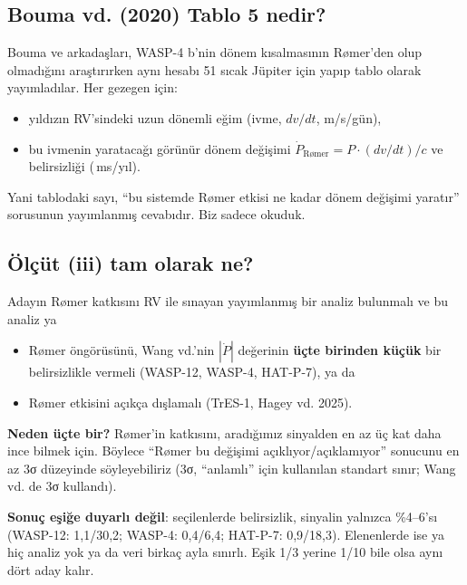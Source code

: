 \documentclass[11pt,a4paper]{article}
\newcounter{sor}[section]
\newcommand{\Pdot}{\ensuremath{\dot{P}}}
\newcommand{\msyil}{\,ms/yıl}
\begin{document}
\subsection{Bouma vd. (2020) Tablo 5 nedir?}
Bouma ve arkadaşları, WASP-4 b'nin dönem kısalmasının Rømer'den olup olmadığını araştırırken aynı hesabı 51 sıcak Jüpiter için yapıp tablo olarak yayımladılar. Her gezegen için:
\begin{itemize}
\item yıldızın RV'sindeki uzun dönemli eğim (ivme, $dv/dt$, m/s/gün),
\item bu ivmenin yaratacağı görünür dönem değişimi $\dot P_\text{Rømer} = P\cdot(dv/dt)/c$ ve belirsizliği (\msyil).
\end{itemize}
Yani tablodaki sayı, ``bu sistemde Rømer etkisi ne kadar dönem değişimi yaratır'' sorusunun yayımlanmış cevabıdır. Biz sadece okuduk.

\subsection{Ölçüt (iii) tam olarak ne?}
Adayın Rømer katkısını RV ile sınayan yayımlanmış bir analiz bulunmalı ve bu analiz ya
\begin{itemize}
\item Rømer öngörüsünü, Wang vd.'nin $|\Pdot|$ değerinin \textbf{üçte birinden küçük} bir belirsizlikle vermeli (WASP-12, WASP-4, HAT-P-7), ya da
\item Rømer etkisini açıkça dışlamalı (TrES-1, Hagey vd. 2025).
\end{itemize}
\textbf{Neden üçte bir?} Rømer'in katkısını, aradığımız sinyalden en az üç kat daha ince bilmek için. Böylece ``Rømer bu değişimi açıklıyor/açıklamıyor'' sonucunu en az 3σ düzeyinde söyleyebiliriz (3σ, ``anlamlı'' için kullanılan standart sınır; Wang vd. de 3σ kullandı).

\textbf{Sonuç eşiğe duyarlı değil}: seçilenlerde belirsizlik, sinyalin yalnızca \%4--6'sı (WASP-12: 1,1/30,2; WASP-4: 0,4/6,4; HAT-P-7: 0,9/18,3). Elenenlerde ise ya hiç analiz yok ya da veri birkaç ayla sınırlı. Eşik 1/3 yerine 1/10 bile olsa aynı dört aday kalır.
\end{document}

